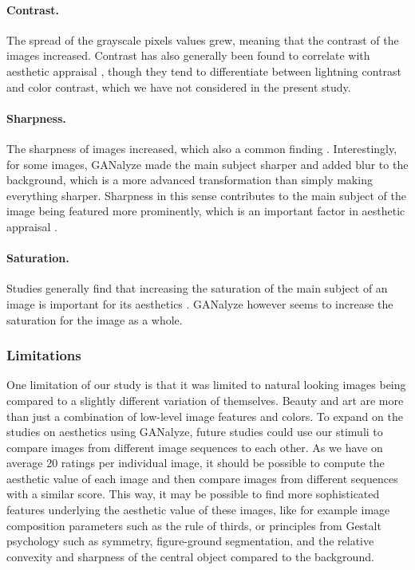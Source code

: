 \documentclass[../main.tex]{subfiles}
\begin{document}
\paragraph{Contrast.} The spread of the grayscale pixels values grew, meaning that the contrast of the images increased. Contrast has also generally been found to correlate with aesthetic appraisal \parencite{wong2009saliency}, though they tend to differentiate between lightning contrast and color contrast, which we have not considered in the present study.

\paragraph{Sharpness.} The sharpness of images increased, which also a common finding \parencite{redi2015beauty}. Interestingly, for some images, GANalyze made the main subject sharper and added blur to the background, which is a more advanced transformation than simply making everything sharper. Sharpness in this sense contributes to the main subject of the image being featured more prominently, which is an important factor in aesthetic appraisal \parencite{wong2009saliency}.

\paragraph{Saturation.} Studies generally find that increasing the saturation of the main subject of an image is important for its aesthetics \parencite{wong2009saliency}. GANalyze however seems to increase the saturation for the image as a whole.


\subsubsection{Limitations}
One limitation of our study is that it was limited to natural looking images being compared to a slightly different variation of themselves. Beauty and art are more than just a combination of low-level image features and colors. To expand on the studies on aesthetics using GANalyze, future studies could use our stimuli to compare images from different image sequences to each other. As we have on average 20 ratings per individual image, it should be possible to compute the aesthetic value of each image and then compare images from different sequences with a similar score. This way, it may be possible to find more sophisticated features underlying the aesthetic value of these images, like for example image composition parameters such as the rule of thirds, or principles from Gestalt psychology such as symmetry, figure-ground segmentation, and the relative convexity and sharpness of the central object compared to the background.
\end{document}
